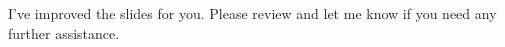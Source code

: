  I've improved the slides for you. Please review and let me know if you need any further assistance.

